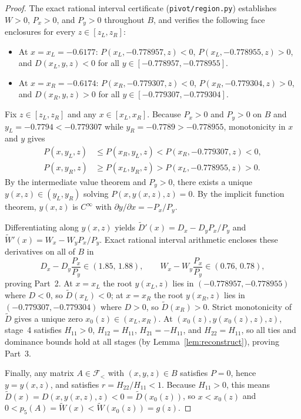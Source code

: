 \documentclass[11pt]{article}
\theoremstyle{remark}
\begin{document}
\begin{proof}
The exact rational interval certificate (\texttt{pivot/region.py}) establishes
$W>0$, $P_x>0$, and $P_y>0$ throughout $B$, and verifies the following
face enclosures for every $z\in[z_L,z_R]$:
\begin{itemize}
  \item At $x=x_L=-0.6177$: $P(x_L,-0.778957,z)<0$,
  $P(x_L,-0.778955,z)>0$, and $D(x_L,y,z)<0$ for all
  $y\in[-0.778957,-0.778955]$.
  \item At $x=x_R=-0.6174$: $P(x_R,-0.779307,z)<0$,
  $P(x_R,-0.779304,z)>0$, and $D(x_R,y,z)>0$ for all
  $y\in[-0.779307,-0.779304]$.
\end{itemize}
Fix $z\in[z_L,z_R]$ and any $x\in[x_L,x_R]$. Because $P_x>0$ and $P_y>0$ on
$B$ and $y_L=-0.7794 < -0.779307$ while $y_R=-0.7789 > -0.778955$,
monotonicity in $x$ and $y$ gives
\begin{align*}
  P(x,y_L,z) &\le P(x_R,y_L,z) < P(x_R,-0.779307,z) < 0, \\
  P(x,y_R,z) &\ge P(x_L,y_R,z) > P(x_L,-0.778955,z) > 0.
\end{align*}
By the intermediate value theorem and $P_y>0$, there exists a unique
$y(x,z)\in(y_L,y_R)$ solving $P(x,y(x,z),z)=0$. By the implicit function
theorem, $y(x,z)$ is $C^\infty$ with $\partial y/\partial x=-P_x/P_y$.

Differentiating along $y(x,z)$ yields
$\tilde{D}'(x) = D_x - D_y P_x/P_y$ and $\tilde{W}'(x) = W_x - W_y P_x/P_y$.
Exact rational interval arithmetic encloses these derivatives on all of $B$ in
\[
  D_x - D_y\frac{P_x}{P_y} \in (1.85,\, 1.88),
  \qquad
  W_x - W_y\frac{P_x}{P_y} \in (0.76,\, 0.78),
\]
proving Part~2. At $x=x_L$ the root $y(x_L,z)$ lies in $(-0.778957,-0.778955)$
where $D<0$, so $\tilde{D}(x_L)<0$; at $x=x_R$ the root $y(x_R,z)$ lies in
$(-0.779307,-0.779304)$ where $D>0$, so $\tilde{D}(x_R)>0$. Strict
monotonicity of $\tilde{D}$ gives a unique zero $x_0(z)\in(x_L,x_R)$. At
$(x_0(z),y(x_0(z),z),z)$, stage~4 satisfies $H_{11}>0$, $H_{12}=H_{11}$,
$H_{21}=-H_{11}$, and $H_{22}=H_{11}$, so all ties and dominance bounds hold
at all stages (by Lemma~\ref{lem:reconstruct}), proving Part~3.

Finally, any matrix $A\in\mathcal{F}_{<}$ with $(x,y,z)\in B$ satisfies $P=0$,
hence $y=y(x,z)$, and satisfies $r=H_{22}/H_{11}<1$. Because $H_{11}>0$, this
means $\tilde{D}(x)=D(x,y(x,z),z)<0=\tilde{D}(x_0(z))$, so $x<x_0(z)$ and
$0<p_5(A)=\tilde{W}(x)<\tilde{W}(x_0(z))=g(z)$.
\end{proof}
\end{document}
